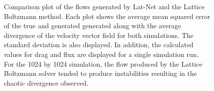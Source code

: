 \documentclass{article}
\begin{document}
\begin{figure}[!t]
\caption{ Comparison plot of the flows generated by Lat-Net and the Lattice Boltzmann method. Each plot shows the average mean squared error of the true and generated generated along with the average divergence of the velocity vector field for both simulations. The standard deviation is also displayed. In addition, the calculated values for drag and flux are displayed for a single simulation run. For the 1024 by 1024 simulation, the flow produced by the Lattice Boltzmann solver tended to produce instabilities resulting in the chaotic divergence observed.}
\label{2d_error_plot}
\end{figure}
\end{document}

